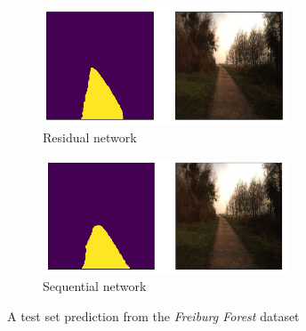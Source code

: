 \documentclass[USenglish]{ifimaster}  %
\begin{document}
\begin{figure}[ht]
\centering
\begin{subfigure}[b]{\textwidth}
\centering
\includegraphics[width=0.8\textwidth]{bilder/freiburg/b57-8406_Clipped_res.png}
\caption{Residual network}
\label{fig:ff_res}
\end{subfigure}
\hfill
\begin{subfigure}[b]{\textwidth}
\centering
\includegraphics[width=0.8\textwidth]{bilder/freiburg/b57-8406_Clipped_seq.png}
\caption{Sequential network}
\label{fig:ff_seq}
\end{subfigure}
\caption{A test set prediction from the \textit{Freiburg Forest} dataset}
\end{figure}
\end{document}
